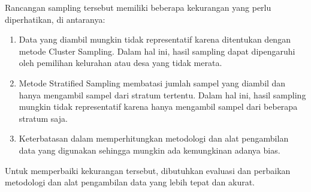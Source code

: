 \documentclass{article}
\begin{document}
Rancangan sampling tersebut memiliki beberapa kekurangan yang perlu diperhatikan, di antaranya:
\begin{enumerate}
    \item Data yang diambil mungkin tidak representatif karena ditentukan dengan metode Cluster Sampling. Dalam hal ini, hasil sampling dapat dipengaruhi oleh pemilihan kelurahan atau desa yang tidak merata.
    \item Metode Stratified Sampling membatasi jumlah sampel yang diambil dan hanya mengambil sampel dari stratum tertentu. Dalam hal ini, hasil sampling mungkin tidak representatif karena hanya mengambil sampel dari beberapa stratum saja.
    \item Keterbatasan dalam memperhitungkan metodologi dan alat pengambilan data yang digunakan sehingga mungkin ada kemungkinan adanya bias.
\end{enumerate}

Untuk memperbaiki kekurangan tersebut, dibutuhkan evaluasi dan perbaikan metodologi dan alat pengambilan data yang lebih tepat dan akurat.

\printbibliography %
\end{document}
